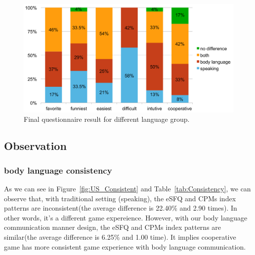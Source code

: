 \begin{figure}[!h]
\centering
\includegraphics[width=0.9\columnwidth]{Figures/US_FQ_Dif.pdf}
\caption{Final questionnaire result for different language group.}
\label{fig:US_FQ_Dif}
\end{figure}



\subsection{Observation}

\subsubsection{body language consistency}
As we can see in Figure~\ref{fig:US_Consistent} and Table~\ref{tab:Consistency}, we can observe that, with traditional setting (speaking), the eSFQ and CPMs index patterns are inconsistent(the average difference is 22.40\% and 2.90 times). In other words, it's a different game expereience. However, with our body language communication manner design, the eSFQ and CPMs index patterns are similar(the average difference is 6.25\% and 1.00 time). It implies cooperative game has more consistent game experience with body language communication.


